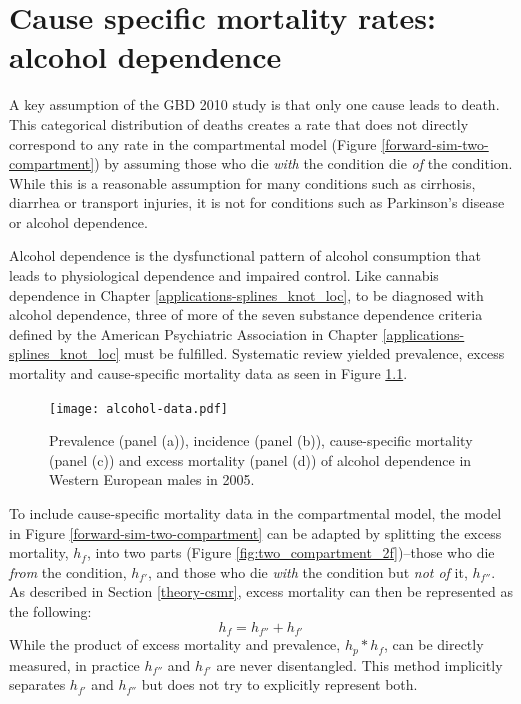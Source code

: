 \chapter{Cause specific mortality rates: alcohol dependence}
\label{applications-csmr}

A key assumption of the GBD 2010 study is that only one cause leads to death.  This categorical distribution of deaths creates a rate that does not directly correspond to any rate in the compartmental model (Figure \ref{forward-sim-two-compartment}) by assuming those who die \emph{with} the condition die \emph{of} the condition.  While this is a reasonable assumption for many conditions such as cirrhosis, diarrhea or transport injuries, it is not for conditions such as Parkinson's disease or alcohol dependence.

Alcohol dependence is the dysfunctional pattern of alcohol consumption that leads to physiological dependence and impaired control.  Like cannabis dependence in Chapter \ref{applications-splines_knot_loc}, to be diagnosed with alcohol dependence, three of more of the seven substance dependence criteria defined by the American Psychiatric Association in Chapter \ref{applications-splines_knot_loc} must be fulfilled. \cite{american_diagnostic_2000, hasin_prevalence_2007}  Systematic review yielded prevalence, excess mortality and cause-specific mortality data as seen in Figure \ref{fig:app-alcohol data}.

    \begin{figure}[h]
        \begin{center}
            \texttt{[image: alcohol-data.pdf]}
            \caption{Prevalence (panel (a)), incidence (panel (b)), cause-specific mortality (panel (c)) and excess mortality (panel (d)) of alcohol dependence in Western European males in 2005.}
            \label{fig:app-alcohol data}
        \end{center}
    \end{figure}

To include cause-specific mortality data in the compartmental model, the model in Figure \ref{forward-sim-two-compartment} can be adapted by splitting the excess mortality, $h_{f}$, into two parts (Figure \ref{fig:two_compartment_2f})--those who die \emph{from} the condition, $h_{f'}$, and those who die \emph{with} the condition but \emph{not of} it, $h_{f''}$.  As described in Section \ref{theory-csmr}, excess mortality can then be represented as the following:
    \begin{equation}
        h_{f} = h_{f''} + h_{f'}
    \end{equation}
While the product of excess mortality and prevalence, $h_{p}*h_{f}$, can be directly measured, in practice $h_{f''}$ and $h_{f'}$ are never disentangled.  This method implicitly separates $h_{f'}$ and $h_{f''}$ but does not try to explicitly represent both.

